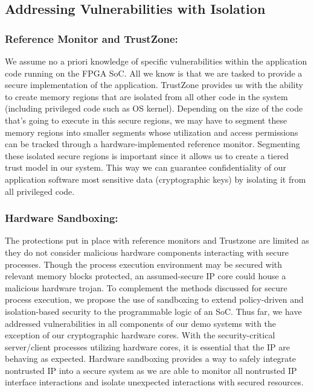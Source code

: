 \documentclass[sigconf]{acmart}
\theoremstyle{plain}
\theoremstyle{remark}
\begin{document}
\subsection{Addressing Vulnerabilities with Isolation}
\subsubsection{Reference Monitor and TrustZone:}
We assume no a priori knowledge of specific vulnerabilities within the application code running on the FPGA SoC. All we know is that we are tasked to provide a secure implementation of the application. TrustZone provides us with the ability to create memory regions that are isolated from all other code in the system (including privileged code such as OS kernel). Depending on the size of the code that's going to execute in this secure regions, we may have to segment these memory regions into smaller segments whose utilization and access permissions can be tracked through a hardware-implemented reference monitor. Segmenting these isolated secure regions is important since it allows us to create a tiered trust model in our system. This way we can guarantee confidentiality of our application software most sensitive data (cryptographic keys) by isolating it from all privileged code.

\subsubsection{Hardware Sandboxing:}
The protections put in place with reference monitors and Trustzone are limited as they do not consider malicious hardware components interacting with secure processes. Though the process execution environment may be secured with relevant memory blocks protected, an assumed-secure IP core could house a malicious hardware trojan. To complement the methods discussed for secure process execution, we propose the use of sandboxing to extend policy-driven and isolation-based security to the programmable logic of an SoC. Thus far, we have addressed vulnerabilities in all components of our demo systems with the exception of our cryptographic hardware cores. With the security-critical server/client processes utilizing hardware cores, it is essential that the IP are behaving as expected. Hardware sandboxing provides a way to safely integrate nontrusted IP into a secure system as we are able to monitor all nontrusted IP interface interactions and isolate unexpected interactions with secured resources.
\end{document}
